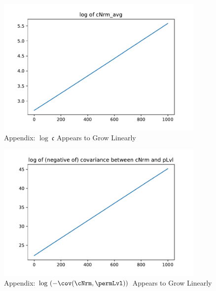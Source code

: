 \documentclass[\econtexRoot/BufferStockTheory]{subfiles}
\begin{document}
\pagebreak
\begin{figure}[ht]
  \centerline{
    \includegraphics[width=4in]{Figures/logcNrm}
  }
  \caption{Appendix: $\log ~\mathfrak{c}$ Appears to Grow Linearly}
  \label{fig:logcNrm}
\end{figure}
\begin{figure}[ht]
  \centerline{
    \includegraphics[width=4in]{Figures/logcov}
  }
  \caption{Appendix: $\log ~(-\cov(\cNrm,\permLvl))$ Appears to Grow Linearly}
  \label{fig:logcov}
\end{figure}
\end{document}
